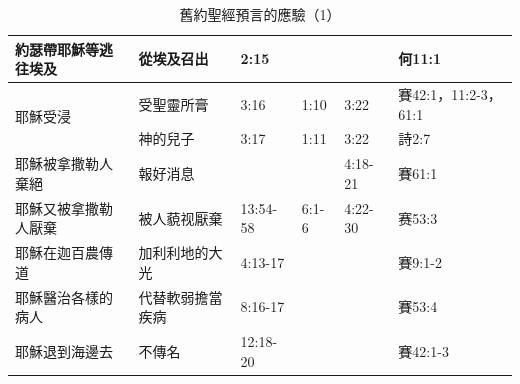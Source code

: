 \begin{table}[htbp]
\begin{tabular}{|p{10.72em}|p{9.11em}|p{4.445em}|l|l|p{8.39em}|}
    \midrule
    約瑟帶耶穌等逃往埃及 & 從埃及召出 & 2:15 &       &       &        何11:1 \\
    \midrule
    \multirow{2}{*}{耶穌受浸} & 受聖靈所膏 & 3:16 & \multicolumn{1}{p{4.39em}|}{1:10} & \multicolumn{1}{p{4.165em}|}{3:22} &        賽42:1，11:2-3，61:1 \\
\cmidrule{2-6}    \multicolumn{1}{|r|}{} & 神的兒子  & 3:17 & \multicolumn{1}{p{4.39em}|}{1:11} & \multicolumn{1}{p{4.165em}|}{3:22} &        詩2:7 \\
    \midrule
        耶穌被拿撒勒人棄絕 & 報好消息  &   & \multicolumn{1}{r|}{} &   4:18-21            & 賽61:1 \\
    \midrule
    耶穌又被拿撒勒人厭棄 & 被人藐视厭棄 &  13:54-58 &  6:1-6 & \multicolumn{1}{p{4.165em}|}{ 4:22-30}        & 赛53:3 \\
    \midrule
    耶穌在迦百農傳道 & 加利利地的大光 &  4:13-17 & \multicolumn{1}{r|}{} &              & 賽9:1-2 \\
    \midrule
    耶穌醫治各樣的病人 & 代替軟弱擔當疾病 &  8:16-17 & \multicolumn{1}{r|}{} &       &         賽53:4 \\
    \midrule
    耶穌退到海邊去 & 不傳名   &  12:18-20 & \multicolumn{1}{r|}{} &       &        賽42:1-3 \\
   
    \bottomrule
    \end{tabular}%
      \caption{舊約聖經預言的應驗（1）}
  \label{tab:addlabel}%
\end{table}%

